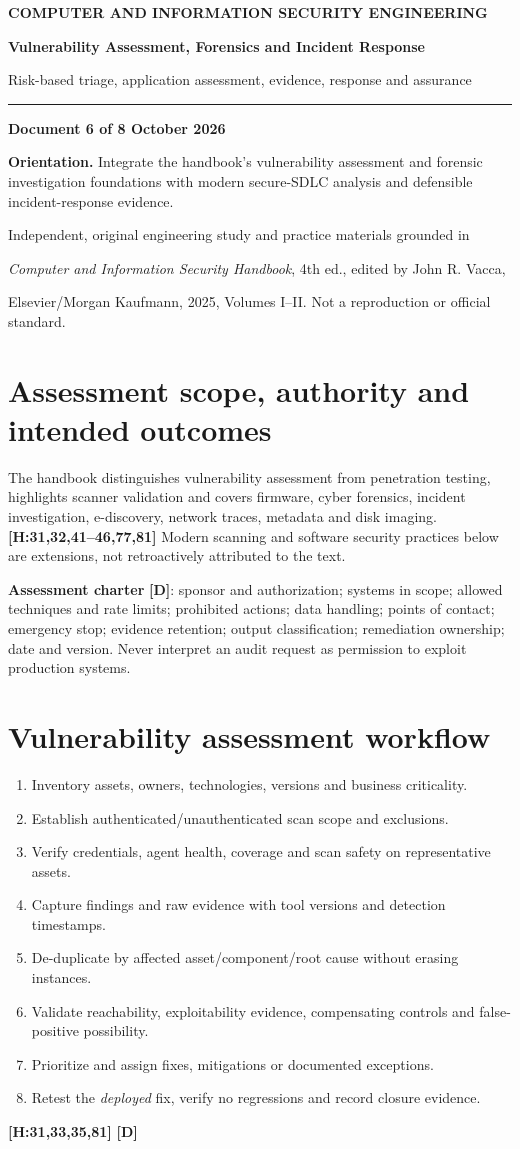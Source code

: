 \documentclass[10pt,letterpaper,oneside]{article}
\newcommand{\handbookref}[1]{\textsf{\color{accent}\textbf{[H:#1]}}}
\newcommand{\designed}{\textsf{\color{accent}\textbf{[D]}}}
\newcommand{\makereportcover}[4]{%
\hypersetup{pageanchor=false}%

\thispagestyle{empty}\vspace*{1.15in}
{\small\bfseries\color{accent} COMPUTER AND INFORMATION SECURITY ENGINEERING}\par\vspace{13pt}
{\Huge\bfseries\color{ink} #1\par}\vspace{15pt}
{\Large\color{muted} #2\par}\vspace{18pt}
\color{accent}\rule{0.94\textwidth}{2.1pt}\par\vspace{20pt}
{\normalsize\bfseries Document #3 of 8 \quad\textbullet\quad 16 October 2026\par}
\vspace{0.35in}
\begin{sourcebox}\textbf{Orientation.} #4\end{sourcebox}
\vfill
{\small\color{muted} Independent, original engineering study and practice materials grounded in\par
\emph{Computer and Information Security Handbook}, 4th ed., edited by John R. Vacca,\par
Elsevier/Morgan Kaufmann, 2025, Volumes I--II. Not a reproduction or official standard.}
\newpage\hypersetup{pageanchor=true}\setcounter{page}{1}\tableofcontents\newpage
}
\begin{document}
\makereportcover{Vulnerability Assessment, Forensics and Incident Response}{Risk-based triage, application assessment, evidence, response and assurance}{6}{Integrate the handbook's vulnerability assessment and forensic investigation foundations with modern secure-SDLC analysis and defensible incident-response evidence.}

\section{Assessment scope, authority and intended outcomes}
The handbook distinguishes vulnerability assessment from penetration testing, highlights scanner validation and covers firmware, cyber forensics, incident investigation, e-discovery, network traces, metadata and disk imaging. \handbookref{31,32,41--46,77,81} Modern scanning and software security practices below are extensions, not retroactively attributed to the text.
\begin{sourcebox}\textbf{Assessment charter} \designed{}: sponsor and authorization; systems in scope; allowed techniques and rate limits; prohibited actions; data handling; points of contact; emergency stop; evidence retention; output classification; remediation ownership; date and version. Never interpret an audit request as permission to exploit production systems.\end{sourcebox}

\section{Vulnerability assessment workflow}
\begin{enumerate}
\item Inventory assets, owners, technologies, versions and business criticality.
\item Establish authenticated/unauthenticated scan scope and exclusions.
\item Verify credentials, agent health, coverage and scan safety on representative assets.
\item Capture findings and raw evidence with tool versions and detection timestamps.
\item De-duplicate by affected asset/component/root cause without erasing instances.
\item Validate reachability, exploitability evidence, compensating controls and false-positive possibility.
\item Prioritize and assign fixes, mitigations or documented exceptions.
\item Retest the \emph{deployed} fix, verify no regressions and record closure evidence.
\end{enumerate}
\handbookref{31,33,35,81} \designed{}
\end{document}
